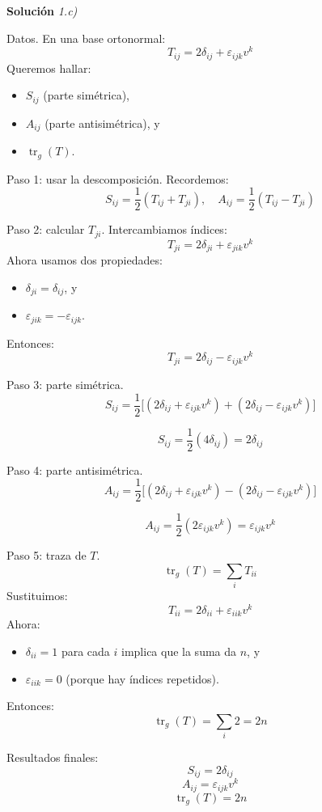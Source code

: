 \documentclass[11pt,spanish]{article}
\DeclareMathOperator{\tr}{tr}
\begin{document}
\vspace{0.5cm}
{\bf Soluci\'on }{\em 1.c)}
\vspace{0.5cm}

Datos.
En una base ortonormal:
$$
T_{ij} = 2\delta_{ij} + \varepsilon_{ijk} v^k
$$
Queremos hallar:
\begin{itemize}
\item $S_{ij}$ (parte simétrica),
\item $A_{ij}$ (parte antisimétrica), y
\item $\tr_g(T)$.
\end{itemize}

Paso 1: usar la descomposición.
Recordemos:
$$
S_{ij} = \frac{1}{2}(T_{ij} + T_{ji}), \quad
A_{ij} = \frac{1}{2}(T_{ij} - T_{ji})
$$

Paso 2: calcular $T_{ji}$.
Intercambiamos índices:
$$
T_{ji} = 2\delta_{ji} + \varepsilon_{jik} v^k
$$
Ahora usamos dos propiedades:
\begin{itemize}
\item $\delta_{ji} = \delta_{ij}$, y
\item $\varepsilon_{jik} = -\varepsilon_{ijk}$.
\end{itemize}
Entonces:
$$
T_{ji} = 2\delta_{ij} - \varepsilon_{ijk} v^k
$$

Paso 3: parte simétrica.
$$
S_{ij} = \frac{1}{2}\Big[(2\delta_{ij} + \varepsilon_{ijk} v^k) + (2\delta_{ij} - \varepsilon_{ijk} v^k)\Big]
$$

$$
S_{ij} = \frac{1}{2}(4\delta_{ij}) = 2\delta_{ij}
$$

Paso 4: parte antisimétrica.
$$
A_{ij} = \frac{1}{2}\Big[(2\delta_{ij} + \varepsilon_{ijk} v^k) - (2\delta_{ij} - \varepsilon_{ijk} v^k)\Big]
$$

$$
A_{ij} = \frac{1}{2}(2\varepsilon_{ijk} v^k) = \varepsilon_{ijk} v^k
$$

Paso 5: traza de $T$.
$$
\tr_g(T) = \sum_i T_{ii}
$$
Sustituimos:
$$
T_{ii} = 2\delta_{ii} + \varepsilon_{iik} v^k
$$
Ahora:
\begin{itemize}
\item $\delta_{ii} = 1$ para cada $i$ implica que la suma da $n$, y
\item $\varepsilon_{iik} = 0$ (porque hay índices repetidos).
\end{itemize}
Entonces:
$$
\tr_g(T) = \sum_i 2 = 2n
$$

Resultados finales:
$$
\boxed{S_{ij} = 2\delta_{ij}}
$$
$$
\boxed{A_{ij} = \varepsilon_{ijk} v^k}
$$
$$
\boxed{\tr_g(T) = 2n}
$$
\end{document}
